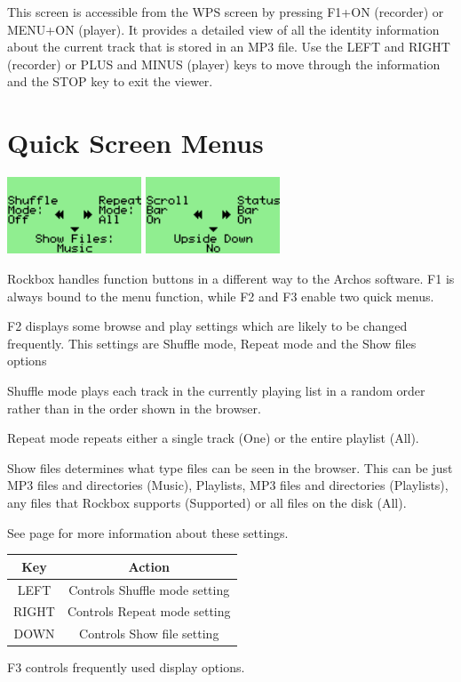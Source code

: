 This screen is accessible from the WPS screen by pressing F1+ON (recorder) or MENU+ON (player).  It provides a detailed view of all the identity information about the current track that is stored in an MP3 file.  Use the LEFT and RIGHT (recorder) or PLUS and MINUS (player) keys to move through the information and the STOP key to exit the viewer.

\section{\label{ref:QuickScreenMenus}Quick Screen Menus}
\begin{center}
  \includegraphics[width=4cm]{rockbox_interface/images/ss-quick-screen-112x64x1.png}
  \includegraphics[width=4cm]{rockbox_interface/images/ss-quick-screen2-112x64x1.png}
\end{center}
Rockbox handles function buttons in a different way to the Archos software. F1 is always bound to the menu function, while F2 and F3 enable two quick menus.

F2 displays some browse and play settings which are likely to be changed frequently. This settings are Shuffle mode, Repeat mode and the Show files options

Shuffle mode plays each track in the currently playing list in a random order rather than in the order shown in the browser.

Repeat mode repeats either a single track (One) or the entire playlist (All).

Show files determines what type files can be seen in the browser.  This can be just MP3 files and directories (Music), Playlists, MP3 files and directories  (Playlists), any files that Rockbox supports (Supported) or all files on the disk (All).

See page \pageref{ref:PlaybackOptions} for more information about these settings.

\begin{table}[h!]
  \begin{center}
    \begin{tabular}{@{}cc@{}}\toprule
      \textbf{Key} & \textbf{Action} \\\midrule
      LEFT & Controls Shuffle mode setting \\
      RIGHT & Controls Repeat mode setting \\
      DOWN & Controls Show file setting \\\bottomrule
    \end{tabular}
  \end{center}
\end{table}
F3 controls frequently used display options.

